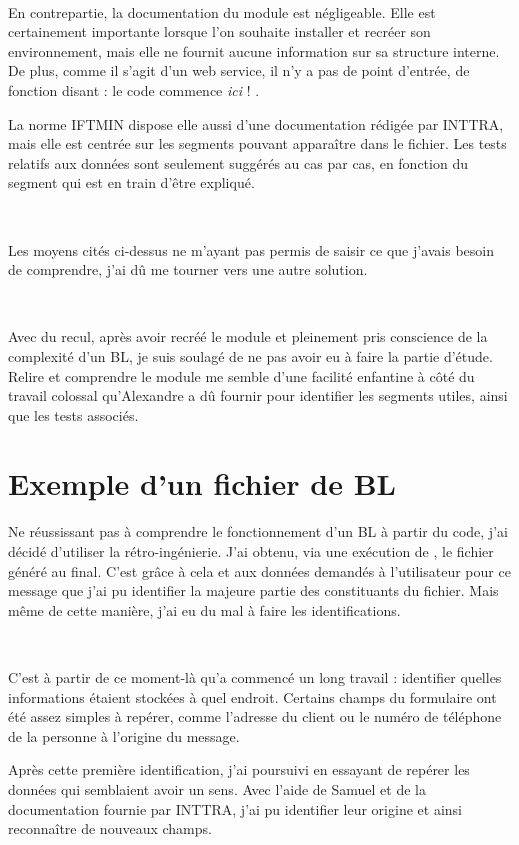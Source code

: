 ~

En contrepartie, la documentation du module est négligeable. Elle est certainement importante lorsque l'on souhaite installer \pireus{} et recréer son environnement, mais elle ne fournit aucune information sur sa structure interne. De plus, comme il s'agit d'un web service, il n'y a pas de point d'entrée, de fonction disant : \og le code commence \emph{ici} ! \fg.

La norme IFTMIN dispose elle aussi d'une documentation rédigée par INTTRA, mais elle est centrée sur les segments pouvant apparaître dans le fichier. Les tests relatifs aux données sont seulement suggérés au cas par cas, en fonction du segment qui est en train d'être expliqué.

~

Les moyens cités ci-dessus ne m'ayant pas permis de saisir ce que j'avais besoin de comprendre, j'ai dû me tourner vers une autre solution.

~

Avec du recul, après avoir recréé le module et pleinement pris conscience de la complexité d'un BL, je suis soulagé de ne pas avoir eu à faire la partie d'étude. Relire et comprendre le module \pireus{} me semble d'une facilité enfantine à côté du travail colossal qu'Alexandre a dû fournir pour identifier les segments utiles, ainsi que les tests associés.


\section{Exemple d'un fichier de BL}
Ne réussissant pas à comprendre le fonctionnement d'un BL à partir du code, j'ai décidé d'utiliser la rétro-ingénierie. J'ai obtenu, via une exécution de \pireus{}, le fichier généré au final. C'est grâce à cela et aux données demandés à l'utilisateur pour ce message que j'ai pu identifier la majeure partie des constituants du fichier. Mais même de cette manière, j'ai eu du mal à faire les identifications.

~

C'est à partir de ce moment-là qu'a commencé un long travail : identifier quelles informations étaient stockées à quel endroit. Certains champs du formulaire \vb{} ont été assez simples à repérer, comme l'adresse du client ou le numéro de téléphone de la personne à l'origine du message.

Après cette première identification, j'ai poursuivi en essayant de repérer les données qui semblaient avoir un sens. Avec l'aide de Samuel et de la documentation fournie par INTTRA, j'ai pu identifier leur origine et ainsi reconnaître de nouveaux champs.

